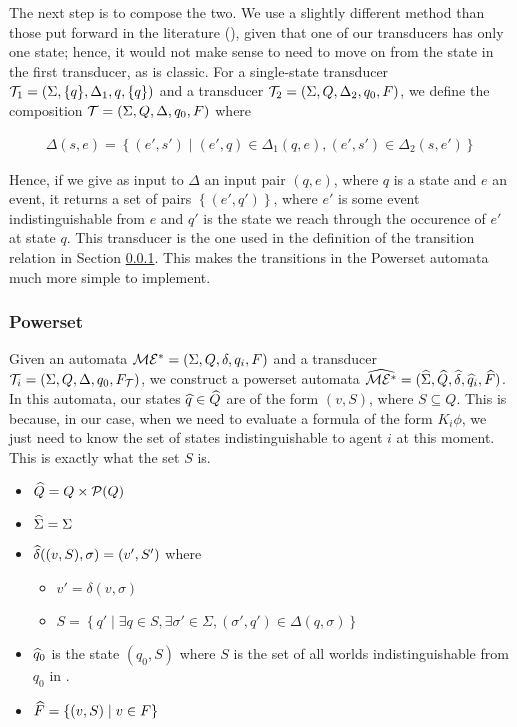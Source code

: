 \documentclass[12pt, a4paper]{article}
\begin{document}
The next step is to compose the two. We use a slightly different method than
those put forward in the literature (\cite{ComposingFSTs}), given that one of
our transducers has only one state; hence, it would not make sense to need to
move on from the state in the first transducer, as is classic. For a
single-state transducer $\mathcal{T}_1 = (\Sigma, \{q\}, \Delta_1, q, \{q\})$ and
a transducer $\mathcal{T}_2 = (\Sigma, Q, \Delta_2, q_0, F)$, we define the
composition $\mathcal{T} = (\Sigma, Q, \Delta, q_0, F)$ where 

\begin{align*}
  \Delta(s, e) = \left\{ (e', s') \mid (e', q) \in \Delta_1(q, e), (e', s') \in \Delta_2(s, e') \right\} 
\end{align*}

Hence, if we give as input to $\Delta$ an input pair $(q, e)$, where $q$ is a
state and $e$ an event, it returns a set of pairs $\left\{ (e', q') \right\}$,
where $e'$ is some event indistinguishable from $e$ and $q'$ is the state we
reach through the occurence of $e'$ at state $q$. This transducer is the one
used in the definition of the transition relation in Section
\ref{subsubsec:Powerset}. This makes the transitions in the Powerset automata
much more simple to implement. 

\subsubsection{Powerset}
\label{subsubsec:Powerset}

Given an automata $\mathcal{ME^\ast} = (\Sigma, Q, \delta, q_i, F)$ and a transducer
$\mathcal{T}_i = (\Sigma, Q, \Delta, q_0, F_{\mathcal{T}})$, we construct a
powerset automata $\widehat{\mathcal{ME^\ast}} = (\widehat{\Sigma}, \widehat{Q}, \widehat{\delta}, \widehat{q}_i,
\widehat{F})$. In this automata, our states $\widehat{q} \in \widehat{Q}$ are of the form $(v,
S)$, where $S \subseteq Q$. This is because, in our case, when we need to
evaluate a formula of the form $K_i\phi$, we just need to know the set of states
indistinguishable to agent $i$ at this moment. This is exactly what the set $S$
is.

\begin{itemize}
\item $\widehat{Q} = Q \times \mathcal{P}(Q)$
\item $\widehat{\Sigma} = \Sigma$ 
\item $\widehat{\delta}((v, S), \sigma) = (v', S')$ where
  \begin{itemize}
  \item $v' =  \delta(v, \sigma)$
  \item $S = \left\{q' \mid \exists q \in S, \exists \sigma' \in \Sigma,
      (\sigma', q') \in \Delta(q, \sigma) \right\}$
  \end{itemize}
\item $\widehat{q}_0$ is the state $(q_0, S)$ where $S$ is the set of all worlds
  indistinguishable from $q_0$ in \mestar.
\item $\widehat{F} = \left\{ (v, S) \mid v \in F \right\}$
\end{itemize}
\end{document}
